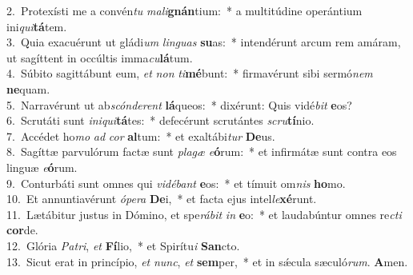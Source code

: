 {2.~}Protexísti me a convén\textit{tu} \textit{ma}\textit{li}\textbf{gnán}tium:~* a multitúdine operántium ini\textit{qui}\textbf{tá}tem.\\
{3.~}Quia exacuérunt ut gládi\textit{um} \textit{lin}\textit{guas} \textbf{su}as:~* intendérunt arcum rem amáram, ut sagíttent in occúltis imma\textit{cu}\textbf{lá}tum.\\
{4.~}Súbito sagittábunt eum, \textit{et} \textit{non} \textit{ti}\textbf{mé}bunt:~* firmavérunt sibi sermó\textit{nem} \textbf{ne}quam.\\
{5.~}Narravérunt ut ab\textit{scón}\textit{de}\textit{rent} \textbf{lá}queos:~* dixérunt: Quis vidé\textit{bit} \textbf{e}os?\\
{6.~}Scrutáti sunt \textit{i}\textit{ni}\textit{qui}\textbf{tá}tes:~* defecérunt scrutántes \textit{scru}\textbf{tí}nio.\\
{7.~}Accédet ho\textit{mo} \textit{ad} \textit{cor} \textbf{al}tum:~* et exaltábi\textit{tur} \textbf{De}us.\\
{8.~}Sagíttæ parvulórum factæ sunt \textit{pla}\textit{gæ} \textit{e}\textbf{ó}rum:~* et infirmátæ sunt contra eos linguæ \textit{e}\textbf{ó}rum.\\
{9.~}Conturbáti sunt omnes qui \textit{vi}\textit{dé}\textit{bant} \textbf{e}os:~* et tímuit om\textit{nis} \textbf{ho}mo.\\
{10.~}Et annuntiavérunt \textit{ó}\textit{pe}\textit{ra} \textbf{De}i,~* et facta ejus intel\textit{le}\textbf{xé}runt.\\
{11.~}Lætábitur justus in Dómino, et spe\textit{rá}\textit{bit} \textit{in} \textbf{e}o:~* et laudabúntur omnes re\textit{cti} \textbf{cor}de.\\
{12.~}Glória \textit{Pa}\textit{tri}, \textit{et} \textbf{Fí}lio,~* et Spirítu\textit{i} \textbf{San}cto.\\
{13.~}Sicut erat in princípio, \textit{et} \textit{nunc}, \textit{et} \textbf{sem}per,~* et in sǽcula sæculó\textit{rum}. \textbf{A}men.\\
